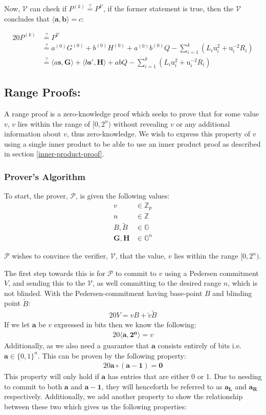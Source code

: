 \documentclass{article}
\newcommand{\eq}[1]{\begin{alignat*}{20}#1\end{alignat*}}
\newcommand{\eqn}[2]{\begin{equation}\label{#1}\begin{split}#2\end{split}\end{equation}}
\renewcommand{\vec}[1]{\boldsymbol{#1}}
\newcommand{\ran}[1]{\mathrm{#1}}
\newcommand{\V}{\mathcal{V}}
\renewcommand{\P}{\mathcal{P}}
\newcommand{\G}{\mathbb{G}}
\newcommand{\Z}{\mathbb{Z}}
\newcommand{\dotp}[2]{\langle #1, #2 \rangle}
\newcommand{\opn}[1]{\operatorname{#1}}
\newcommand{\vecl}[1]{\vec{#1_{\opn{L}}}}
\newcommand{\vecr}[1]{\vec{#1_{\opn{R}}}}
\newcommand{\blind}[1]{\widetilde{#1}}
\newcommand{\bv}{\blind{v}}
\newcommand{\bB}{\blind{B}}
\begin{document}
Now, $\V$ can check if $P^{(k)} \stackrel{?}{=} P^{\V}$,
if the former statement is true, then the $\V$ concludes that
$\dotp{\vec{a}}{\vec{b}} = c$:

\eq{
	P^{(k)} &\stackrel{?}{=} P^{\V} \\
	        &\stackrel{?}{=} a^{(0)}G^{(0)} + b^{(0)}H^{(0)} + a^{(0)}b^{(0)}Q - \sum^k_{i=1} (L_i \ran{u}^2_i + \ran{u}^{-2}_i R_i) \\
	        &\stackrel{?}{=} \dotp{a\vec{s}}{\vec{G}} + \dotp{b\vec{s'}}{\vec{H}} + abQ - \sum^k_{i=1} (L_i \ran{u}^2_i + \ran{u}^{-2}_i R_i)
}

\newpage

\subsection{Range Proofs:} \label{range-proofs}

A range proof is a zero-knowledge proof which seeks to prove that for
some value $v$, $v$ lies within the range of $[0,2^n)$ without revealing
$v$ or any additional information about $v$, thus zero-knowledge. We
wish to express this property of $v$ using a single inner product to be
able to use an inner product proof as described in section
\ref{inner-product-proof}.

\subsubsection{Prover's Algorithm}\label{prover-range-proofs}

To start, the prover, $\P$, is given the following values:
\eqn{def1}{
	v &\in \Z_p \\
	n &\in \Z\\
	B, \bB &\in \G\\
	\vec{G}, \vec{H} &\in \G^n
}

$\P$ wishes to convince the verifier, $\V$, that the value, $v$ lies
within the range $[0,2^n)$.

The first step towards this is for $\P$ to commit to $v$ using
a Pedersen commitment $V$, and sending this to the $\V$, as well
committing to the desired range $n$, which is not blinded. With the
Pedersen-commitment having base-point $B$ and blinding point $\bB$:
\eq{
	V = vB + \bv \bB
}
If we let $\vec{a}$ be $v$ expressed in bits then we know the following:
\eq{
	\dotp{\vec{a}}{\vec{2^n}} = v
}
Additionally, as we also need a guarantee that $\vec{a}$ consists
entirely of bits i.e. $\vec{a} \in \{0,1\}^n$. This can be
proven by the following property:
\eq{
	\vec{a} \circ (\vec{a} - \vec{1}) = \vec{0}
}
This property will only hold if $\vec{a}$ has entries that are either
0 or 1. Due to needing to commit to both $\vec{a}$ and $\vec{a}
- \vec{1}$, they will henceforth be referred to as $\vecl{a}$ and
$\vecr{a}$ respectively. Additionally, we add another property to
show the relationship between these two which gives us the following
properties:
\end{document}

